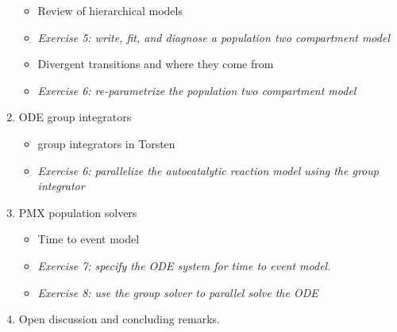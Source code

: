 \documentclass[12pt]{article}
\begin{document}
\begin{enumerate}
   \begin{itemize}
     \item Review of hierarchical models
     \item \textit{Exercise 5: write, fit, and diagnose a population two compartment model}
     \item Divergent transitions and where they come from
     \item \textit{Exercise 6: re-parametrize the population two compartment model}
   \end{itemize}
   \item ODE group integrators
   \begin{itemize}
     \item group integrators in Torsten
     \item \textit{Exercise 6: parallelize the autocatalytic reaction model using the group integrator}
   \end{itemize}
   \item PMX population solvers
   \begin{itemize}
     \item Time to event model
     \item \textit{Exercise 7: specify the ODE system for time to event model.}
     \item \textit{Exercise 8: use the group solver to parallel solve the ODE}
   \end{itemize}
   \item Open discussion and concluding remarks.
 \end{enumerate}
\end{document}
